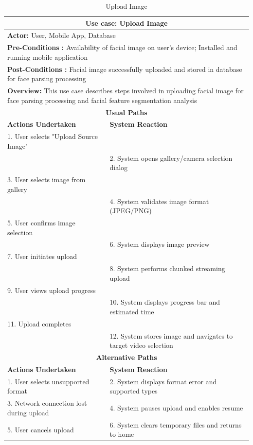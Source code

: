 \documentclass[12pt,a4paper]{report}
\begin{document}
\begin{table}[H]
\centering
\caption{Upload Image}
\begin{tabular}{|p{6cm}|p{6cm}|}
\hline
\multicolumn{2}{|c|}{\textbf{Use case: Upload Image}} \\
\hline
\multicolumn{2}{|p{12cm}|}{\textbf{Actor:} User, Mobile App, Database} \\
\hline
\multicolumn{2}{|p{12cm}|}{\textbf{Pre-Conditions :} Availability of facial image on user's device; Installed and running mobile application} \\
\hline
\multicolumn{2}{|p{12cm}|}{\textbf{Post-Conditions :} Facial image successfully uploaded and stored in database for face parsing processing} \\
\hline
\multicolumn{2}{|p{12cm}|}{\textbf{Overview:} This use case describes steps involved in uploading facial image for face parsing processing and facial feature segmentation analysis} \\
\hline
\multicolumn{2}{|c|}{\textbf{Usual Paths}} \\
\hline
\textbf{Actions Undertaken} & \textbf{System Reaction} \\
\hline
1. User selects "Upload Source Image" & \\
\hline
 & 2. System opens gallery/camera selection dialog \\
\hline
3. User selects image from gallery & \\
\hline
 & 4. System validates image format (JPEG/PNG) \\
\hline
5. User confirms image selection & \\
\hline
 & 6. System displays image preview \\
\hline
7. User initiates upload & \\
\hline
 & 8. System performs chunked streaming upload \\
\hline
9. User views upload progress & \\
\hline
 & 10. System displays progress bar and estimated time \\
\hline
11. Upload completes & \\
\hline
 & 12. System stores image and navigates to target video selection \\
\hline
\multicolumn{2}{|c|}{\textbf{Alternative Paths}} \\
\hline
\textbf{Actions Undertaken} & \textbf{System Reaction} \\
\hline
1. User selects unsupported format & 2. System displays format error and supported types \\
\hline
3. Network connection lost during upload & 4. System pauses upload and enables resume \\
\hline
5. User cancels upload & 6. System clears temporary files and returns to home \\
\hline
\end{tabular}
\end{table}
\end{document}
